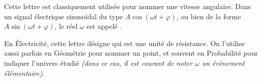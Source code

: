 
\cadre{$\omega$} Cette lettre est classiquement utilisée pour nommer une vitesse angulaire. Dans un signal électrique sinusoïdal du type $A\cos(\omega t + \varphi)$, ou bien de la forme $A\sin(\omega t + \varphi)$, le réel $\omega$ est appelé .

\cadre{$\Omega$} En Électricité, cette lettre désigne  qui est une unité de résistance. On l'utilise aussi parfois en Géométrie pour nommer un point, et souvent en Probabilité pour indiquer l'univers étudié \emph{(dans ce cas, il est courant de noter $\omega$ un évènement élémentaire)}.

